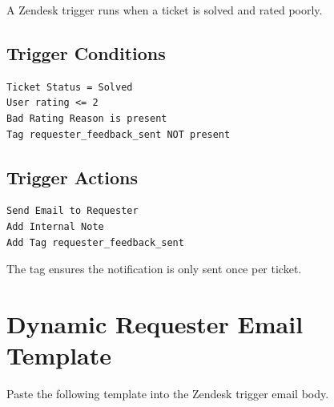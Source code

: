 \documentclass[11pt]{article}
\begin{document}
A Zendesk trigger runs when a ticket is solved and rated poorly.

\subsection{Trigger Conditions}

\begin{lstlisting}
Ticket Status = Solved
User rating <= 2
Bad Rating Reason is present
Tag requester_feedback_sent NOT present
\end{lstlisting}

\subsection{Trigger Actions}

\begin{lstlisting}
Send Email to Requester
Add Internal Note
Add Tag requester_feedback_sent
\end{lstlisting}

The tag ensures the notification is only sent once per ticket.

\section{Dynamic Requester Email Template}

Paste the following template into the Zendesk trigger email body.
\end{document}
